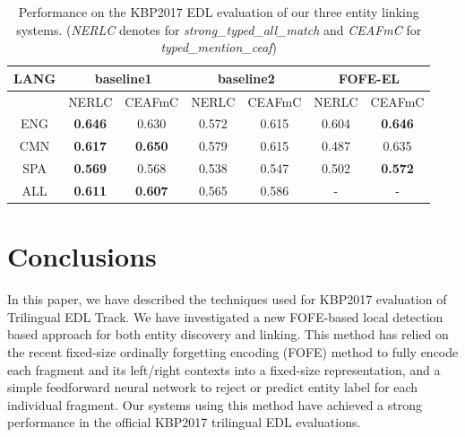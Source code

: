 \documentclass[11pt]{article}
\begin{document}
\begin{table}
\centering
\begin{tabular}{|c|c|c|c|c|c|c|}  \hline
LANG  &  \multicolumn{2}{|c|}{baseline1} & \multicolumn{2}{|c|}{baseline2} &  \multicolumn{2}{|c|}{FOFE-EL} \\ \hline
 &  NERLC  & CEAFmC  &  NERLC  & CEAFmC &  NERLC  & CEAFmC \\ \hline
ENG &  {\bf 0.646} & 0.630 &  0.572 & 0.615 & 0.604 & {\bf 0.646} \\
CMN  &  {\bf 0.617} & {\bf 0.650} & 0.579 & 0.615 & 0.487 & 0.635 \\	
SPA  & {\bf 0.569} & 0.568 & 0.538 & 0.547 & 0.502 & {\bf 0.572}  \\ \hline
ALL  & {\bf 0.611} & {\bf 0.607} & 0.565 & 0.586 & - & - \\ \hline
\end{tabular}
\caption{Performance on the KBP2017 EDL evaluation of our three entity linking systems. ({\em NERLC} denotes for {\em strong\_typed\_all\_match} and {\em CEAFmC} for {\em typed\_mention\_ceaf}) } 
\label{tbl:kbp2017-entity-linking}	
\end{table}

\section{Conclusions}

In this paper, we have described the techniques used for KBP2017 evaluation of Trilingual EDL Track. We have investigated a new FOFE-based local detection based approach for both entity discovery and linking. This method has relied on the recent fixed-size ordinally forgetting encoding (FOFE) method to fully encode each fragment and its left/right contexts into a fixed-size representation, and a simple feedforward neural network to reject or predict entity label for each individual fragment. 
Our systems using this method have achieved a strong performance in the official KBP2017 trilingual EDL evaluations. 



\end{document}
